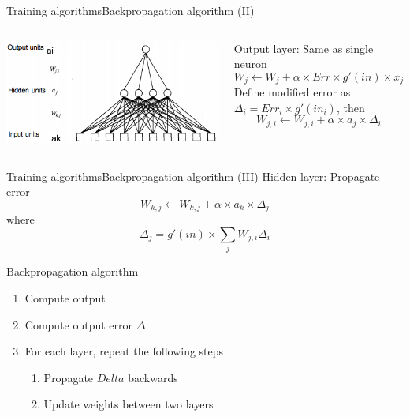 \documentclass[10pt,compress]{beamer} %
\begin{document}
\begin{frame}{Training algorithms}{Backpropagation algorithm (II)}
    \begin{columns}
	\centering\includegraphics[width=\linewidth]{figs/russell.png}

	Output layer: Same as single neuron
	\begin{equation*}
	W_j \leftarrow W_j + \alpha \times Err \times g'(in) \times x_j
	\end{equation*}
	Define modified error as $\Delta_i = Err_i \times g'(in_i) $, then
	\begin{equation*}
	W_{j,i} \leftarrow W_{j,i} + \alpha \times a_j \times \Delta_i
	\end{equation*}
	\end{columns}
\end{frame}

\begin{frame}{Training algorithms}{Backpropagation algorithm (III)}
Hidden layer: Propagate error
\begin{equation*}
W_{k,j} \leftarrow W_{k,j} + \alpha \times a_k \times \Delta_j
\end{equation*}
where
\begin{equation*}
\Delta_j = g'(in) \times \sum_j W_{j,i}\Delta_i
\end{equation*}

\begin{block}{Backpropagation algorithm}
\begin{enumerate}
\item Compute output
\item Compute output error $\Delta$
\item For each layer, repeat the following steps
\begin{enumerate}
	\item Propagate $Delta$ backwards
	\item Update weights between two layers
\end{enumerate}
\end{enumerate}
\end{block}
\end{frame}
\end{document}

